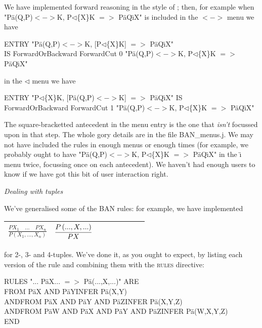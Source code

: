 We have implemented forward reasoning in the style of ; then, for example when "P\"{a}(Q,P)$<->$K, P$\triangleleft$\{X\}K $=>$ P\"{a}Q\"{\i}X" is included in the $<->$ menu we have

ENTRY "P\"{a}(Q,P)$<->$K, [P$\triangleleft$\{X\}K] $=>$ P\"{a}Q\"{\i}X"\\
\tab IS ForwardOrBackward ForwardCut 0 "P\"{a}(Q,P)$<->$K, P$\triangleleft$\{X\}K $=>$ P\"{a}Q\"{\i}X"


in the $\triangleleft$ menu we have

ENTRY "P$\triangleleft$\{X\}K, [P\"{a}(Q,P)$<->$K] $=>$ P\"{a}Q\"{\i}X" IS \\
\tab ForwardOrBackward ForwardCut 1 "P\"{a}(Q,P)$<->$K, P$\triangleleft$\{X\}K $=>$ P\"{a}Q\"{\i}X"


The square-bracketted antecedent in the menu entry is the one that \textit{isn't} focussed upon in that step. The whole gory details are in the file BAN\_menus.j. We may not have included the rules in enough menus or enough times (for example, we probably ought to have "P\"{a}(Q,P)$<->$K, P$\triangleleft$\{X\}K $=>$ P\"{a}Q\"{\i}X" in the \"{\i} menu twice, focussing once on each antecedent). We haven't had enough users to know if we have got this bit of user interaction right.


\textit{Dealing with tuples}


We've generalised some of the BAN rules: for example, we have implemented\\


\begin{tabular}{|p{1.082in}|p{1.082in}|p{1.082in}|p{1.082in}|p{0.043in}|p{0.043in}|p{0.043in}|p{0.043in}|} \hline
{\raggedright $\frac{PX_{1} \quad ...\quad PX_{n} }{P\left( X_{1},...,X_{n} \right) } $ } & {\raggedright $\infer{PX}
       {P\left( ...,X,...\right) }$ } & {\raggedright } & {\raggedright }\\
\hline \end{tabular}


for 2-, 3- and 4-tuples. We've done it, as you ought to expect, by listing each version of the rule and combining them with the \textsc{rules} directive:

RULES "... P\"{a}X... $=>$ P\"{a}(...,X,...)" ARE\\
\tab FROM P\"{a}X AND P\"{a}Y\tab INFER P\"{a}(X,Y) \\
AND\tab FROM P\"{a}X AND P\"{a}Y AND P\"{a}Z\tab INFER P\"{a}(X,Y,Z) \\
AND\tab FROM P\"{a}W AND P\"{a}X AND P\"{a}Y AND P\"{a}Z\tab INFER P\"{a}(W,X,Y,Z)\\
END

